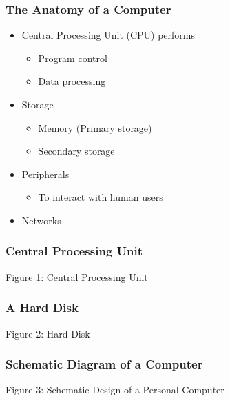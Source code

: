 \documentclass{beamer}
\begin{document}
\begin{frame}[t,fragile] \frametitle{The Anatomy of a Computer} %
    \begin{itemize}
        \item Central Processing Unit (CPU) performs
        \begin{itemize}
            \item Program control
            \item Data processing
        \end{itemize}
        \item Storage
        \begin{itemize}
            \item Memory (Primary storage)
            \item Secondary storage
        \end{itemize}
        \item Peripherals
        \begin{itemize}
            \item To interact with human users
        \end{itemize}
        \item Networks
    \end{itemize}
\end{frame}

\begin{frame}[t,fragile] \frametitle{Central Processing Unit} %
    \begin{center}
        Figure 1: Central Processing Unit
    \end{center}
\end{frame}

\begin{frame}[t,fragile] \frametitle{A Hard Disk} %
    \begin{center}
        Figure 2: Hard Disk
    \end{center}
\end{frame}

\begin{frame}[t,fragile] \frametitle{Schematic Diagram of a Computer} %
    \begin{center}
        Figure 3: Schematic Design of a Personal Computer
    \end{center}
\end{frame}
\end{document}
